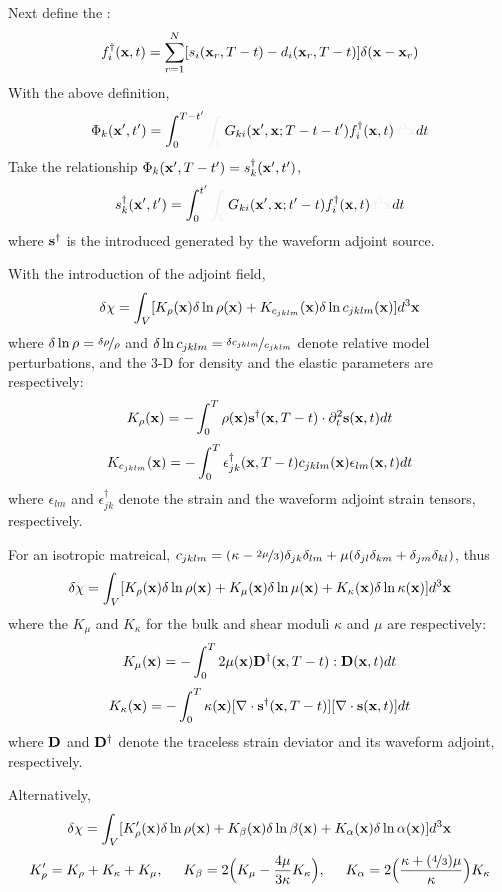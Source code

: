 Next define the :
\[ f_i^\dagger(\mathbf{x},t)=\sum_{r=1}^N[s_i(\mathbf{x}_r,T-t)-d_i(\mathbf{x}_r,T-t)]\delta(\mathbf{x}-\mathbf{x}_r) \]
With the above definition,
\[ \Phi_k(\mbf x',t')=\int_0^{T-t'}\myde{\int_V}G_{ki}(\mbf x',\mbf x;T-t-t')f_i^\dagger(\mbf x,t)\myde{d^3\mbf x}dt \]
Take the relationship $\Phi_k(\mathbf{x}',T-t')=s_k^\dagger(\mathbf{x}',t')$,
\[ s_k^\dagger(\mbf x',t')=\int_0^{t'}\myde{\int_V}G_{ki}(\mbf x',\mbf x;t'-t)f_i^\dagger(\mbf x,t)\myde{d^3\mbf x}dt \]
where $\mathbf{s}^\dagger$ is the introduced  generated by the waveform adjoint source.\par
With the introduction of the adjoint field,
\[ \delta\chi=\int_V[K_\rho(\mathbf{x})\delta\ln\rho(\mathbf{x})+K_{c_{jklm}}(\mathbf{x})\delta\ln c_{jklm}(\mathbf{x})]d^3\mathbf{x} \]
where $\delta\ln\rho=\nicefrac{\delta\rho}{\rho}$ and $\delta\ln c_{jklm}=\nicefrac{\delta c_{jklm}}{c_{jklm}}$ denote relative model perturbations, and the 3-D  for density and the elastic parameters are respectively:
\[ K_\rho(\mathbf{x})=-\int_0^T\rho(\mathbf{x})\mathbf{s}^\dagger(\mathbf{x},T-t)\cdot\partial_t^2\mathbf{s}(\mathbf{x},t)dt \]
\[ K_{c_{jklm}}(\mathbf{x})=-\int_0^T\epsilon_{jk}^\dagger(\mathbf{x},T-t)c_{jklm}(\mathbf{x})\epsilon_{lm}(\mathbf{x},t)dt \]
where  $\epsilon_{lm}$ and $\epsilon_{jk}^\dagger$ denote the strain and the waveform adjoint strain tensors, respectively.\par
For an isotropic matreical, $c_{jklm}=(\kappa-\nicefrac{2\mu}{3})\delta_{jk}\delta_{lm}+\mu(\delta_{jl}\delta_{km}+\delta_{jm}\delta_{kl})$, thus
\[ \delta\chi=\int_V[K_\rho(\mathbf{x})\delta\ln\rho(\mathbf{x})+K_\mu(\mathbf{x})\delta\ln\mu(\mathbf{x})+K_\kappa(\mathbf{x})\delta\ln\kappa(\mathbf{x})]d^3\mathbf{x} \]
where the  $K_\mu$ and $K_\kappa$ for the bulk and shear moduli $\kappa$ and $\mu$ are respectively:
\[ K_\mu(\mathbf{x})=-\int_0^T2\mu(\mathbf{x})\mathbf{D}^\dagger(\mathbf{x},T-t):\mathbf{D}(\mathbf{x},t)dt \]
\[ K_\kappa(\mathbf{x})=-\int_0^T\kappa(\mathbf{x})[\nabla\cdot\mathbf{s}^\dagger(\mathbf{x},T-t)][\nabla\cdot\mathbf{s}(\mathbf{x},t)]dt \]
where $\mathbf{D}$ and $\mathbf{D}^\dagger$ denote the traceless strain deviator and its waveform adjoint, respectively.\par
Alternatively,
\[ \delta\chi=\int_V[K_\rho^\prime(\mathbf{x})\delta\ln\rho(\mathbf{x})+K_\beta(\mathbf{x})\delta\ln\beta(\mathbf{x})+K_\alpha(\mathbf{x})\delta\ln\alpha(\mathbf{x})]d^3\mathbf{x} \]
\[ K_\rho^\prime=K_\rho+K_\kappa+K_\mu, \hspace{5mm} K_\beta=2\Big(K_\mu-\frac{4\mu}{3\kappa}K_\kappa\Big), \hspace{5mm} K_\alpha=2\Big(\frac{\kappa+(\nicefrac{4}{3})\mu}{\kappa}\Big)K_\kappa \]\par
